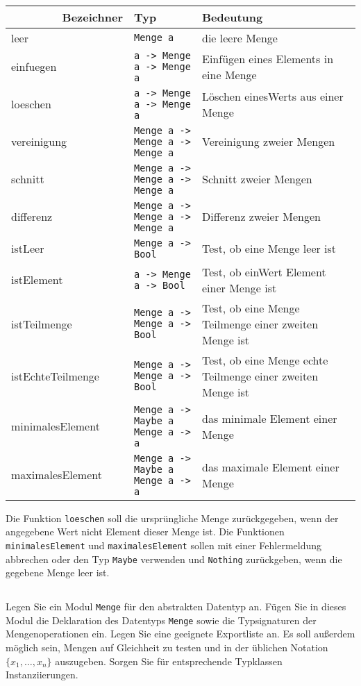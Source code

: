 \documentclass[
  10pt,                   %
  DIV12,
  german,                 %
  oneside,                %
  parskip=half,           %
  headings=normal,        %
  captions=tableheading,  %
]{scrartcl}
\begin{document}
\begin{table}[H]
    \begin{tabular}{lp{5.5cm}p{6.5cm}} %
        Bezeichner & Typ & Bedeutung         \\ \hline
		leer & \lstinline|Menge a| & die leere Menge \\
		einfuegen & \lstinline|a -> Menge a -> Menge a| & Einfügen eines Elements in eine Menge\\
		loeschen & \lstinline|a -> Menge a -> Menge a| & Löschen einesWerts aus einer Menge\\
		vereinigung & \lstinline|Menge a -> Menge a -> Menge a| & Vereinigung zweier Mengen\\
		schnitt & \lstinline|Menge a -> Menge a -> Menge a| & Schnitt zweier Mengen\\
		differenz & \lstinline|Menge a -> Menge a -> Menge a| & Differenz zweier Mengen\\
		istLeer & \lstinline|Menge a -> Bool| & Test, ob eine Menge leer ist\\
		istElement & \lstinline|a -> Menge a -> Bool| & Test, ob einWert Element einer Menge ist\\
		istTeilmenge & \lstinline|Menge a -> Menge a -> Bool| & Test, ob eine Menge Teilmenge einer \newline zweiten Menge ist\\
		istEchteTeilmenge & \lstinline|Menge a -> Menge a -> Bool| & Test, ob eine Menge echte Teilmenge einer \newline zweiten Menge ist\\
		minimalesElement & \lstinline|Menge a -> Maybe a| \newline \lstinline|Menge a -> a| & das minimale Element einer Menge\\
		maximalesElement & \lstinline|Menge a -> Maybe a| \newline \lstinline|Menge a -> a| & das maximale Element einer Menge
	\end{tabular}	
\end{table}
Die Funktion \lstinline|loeschen| soll die ursprüngliche Menge zurückgegeben, wenn der angegebene Wert nicht Element dieser Menge ist. Die Funktionen \lstinline|minimalesElement| und
\lstinline|maximalesElement| sollen mit einer Fehlermeldung abbrechen oder den Typ \lstinline|Maybe| verwenden und \lstinline|Nothing| zurückgeben, wenn die gegebene Menge
leer ist.

\subsection{}
Legen Sie ein Modul \lstinline|Menge| für den abstrakten Datentyp
an. Fügen Sie in dieses Modul die Deklaration des Datentyps \lstinline|Menge| sowie die
Typsignaturen der Mengenoperationen ein. Legen Sie eine geeignete Exportliste
an. Es soll außerdem möglich sein, Mengen auf Gleichheit zu testen und in der
üblichen Notation $\{x_1, \ldots , x_n\}$ auszugeben. Sorgen Sie für entsprechende Typklassen Instanziierungen.
\end{document}
